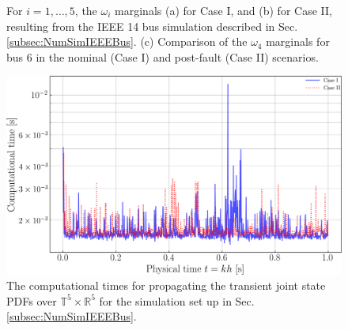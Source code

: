 \documentclass[10pt,twocolumn]{IEEEtran}
\begin{document}
\begin{figure}[ht!]
   \hspace{\fill}
   \hspace{\fill}
\caption{\small{For $i=1,\hdots,5$, the $\omega_{i}$ marginals (a) for Case I, and (b) for Case II, resulting from the IEEE 14 bus simulation described in Sec. \ref{subsec:NumSimIEEEBus}. (c) Comparison of the $\omega_{4}$ marginals for bus 6 in the nominal (Case I) and post-fault (Case II) scenarios.}}
\vspace*{-0.1in}
\label{fig:IEEE14omegamarginalsCase12}
\end{figure}






\begin{figure}[htpb]
\centering
\includegraphics[width=0.95\linewidth]{ComputationalTimeSyntheticIEEE14busCase1and2combined.png}
\caption{\small{The computational times for propagating the transient joint state PDFs over $\mathbb{T}^{5}\times\mathbb{R}^{5}$ for the simulation set up in Sec. \ref{subsec:NumSimIEEEBus}.}}
\vspace*{-0.1in}
\label{fig:CompTimeIEEE14bus}
\end{figure}
\end{document}
